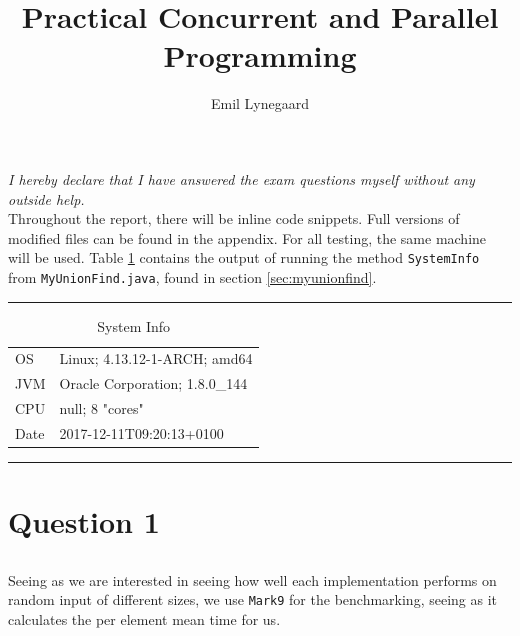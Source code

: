 \documentclass[a5paper]{article}
\title{Practical Concurrent and Parallel Programming}
\author{Emil Lynegaard}
\begin{document}


\newpage
\tableofcontents
\newpage

\maketitle
\textit{I hereby declare that I have answered the exam questions myself without any outside help.}\\

Throughout the report, there will be inline code snippets. Full versions of modified files can be found in the appendix. For all testing, the same machine will be used. Table \ref{table:sysinfo} contains the output of running the method \texttt{SystemInfo} from \texttt{MyUnionFind.java}, found in section \ref{sec:myunionfind}.

\par\noindent\rule{\textwidth}{0.4pt}
\begin{table}[!ht]
\begin{center}
\begin{tabular}{ l l }
OS & Linux; 4.13.12-1-ARCH; amd64\\
JVM & Oracle Corporation; 1.8.0\_144\\
CPU & null; 8 "cores"\\
Date & 2017-12-11T09:20:13+0100
\end{tabular}
\end{center}
\caption{System Info}
\label{table:sysinfo}
\end{table}
\par\noindent\rule{\textwidth}{0.4pt}
\newpage

\section{Question 1}
\subsection{}
Seeing as we are interested in seeing how well each implementation performs on random input of different sizes, we use \texttt{Mark9} for the benchmarking, seeing as it calculates the per element mean time for us.
\end{document}
